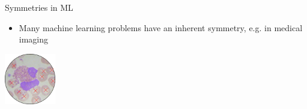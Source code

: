\documentclass[
                20pt,
                final,
                hyperref={%
                    breaklinks=true,%
                    letterpaper=true,%
                    colorlinks,%
                    bookmarks=false%
                }]{beamer}
\newlength{\onecolwid}
\begin{document}
\begin{frame}[t]
\begin{columns}[t]
\begin{column}{\onecolwid}
                \begin{alertblock}{\Large{Symmetries in ML}}
                    \begin{itemize}
                        \item{Many machine learning problems have an inherent symmetry, e.g. in medical imaging}
                    \end{itemize}
                    \begin{center}
                        \includegraphics[width=6em]{img/cells_cropped_labeled_edge.png}

\end{center}
\end{alertblock}
\end{column}
\end{columns}
\end{frame}
\end{document}
